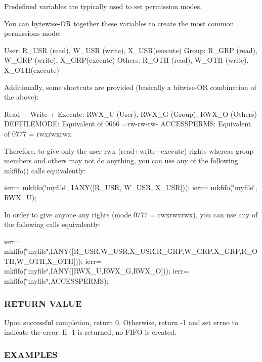 Predefined variables are typically used to set permission modes.

You can bytewise-\/\+OR together these variables to create the most common permissions mode\+:

User\+: R\+\_\+\+U\+SR (read), W\+\_\+\+U\+SR (write), X\+\_\+\+U\+S\+R(execute) Group\+: R\+\_\+\+G\+RP (read), W\+\_\+\+G\+RP (write), X\+\_\+\+G\+R\+P(execute) Others\+: R\+\_\+\+O\+TH (read), W\+\_\+\+O\+TH (write), X\+\_\+\+O\+T\+H(execute)

Additionally, some shortcuts are provided (basically a bitwise-\/\+OR combination of the above)\+:

Read + Write + Execute\+: R\+W\+X\+\_\+U (User), R\+W\+X\+\_\+G (Group), R\+W\+X\+\_\+O (Others) D\+E\+F\+F\+I\+L\+E\+M\+O\+DE\+: Equivalent of 0666 =rw-\/rw-\/rw-\/ A\+C\+C\+E\+S\+S\+P\+E\+R\+MS\+: Equivalent of 0777 = rwxrwxrwx

Therefore, to give only the user rwx (read+write+execute) rights whereas group members and others may not do anything, you can use any of the following mkfifo() calls equivalently\+:

ierr= mkfifo(\char`\"{}myfile\char`\"{}, I\+A\+N\+Y(\mbox{[}\+R\+\_\+\+U\+S\+R, W\+\_\+\+U\+S\+R, X\+\_\+\+U\+S\+R\mbox{]})); ierr= mkfifo(\char`\"{}myfile\char`\"{}, R\+W\+X\+\_\+U);

In order to give anyone any rights (mode 0777 = rwxrwxrwx), you can use any of the following calls equivalently\+:

ierr= mkfifo(\char`\"{}myfile\char`\"{},I\+A\+N\+Y(\mbox{[}\+R\+\_\+\+U\+S\+R,\+W\+\_\+\+U\+S\+R,\+X\+\_\+\+U\+S\+R,\+R\+\_\+\+G\+R\+P,\+W\+\_\+\+G\+R\+P,\+X\+\_\+\+G\+R\+P,\+R\+\_\+\+O\+T\+H,\+W\+\_\+\+O\+T\+H,\+X\+\_\+\+O\+T\+H\mbox{]})); ierr= mkfifo(\char`\"{}myfile\char`\"{},I\+A\+N\+Y(\mbox{[}\+R\+W\+X\+\_\+\+U,\+R\+W\+X\+\_\+\+G,\+R\+W\+X\+\_\+\+O\mbox{]})); ierr= mkfifo(\char`\"{}myfile\char`\"{},A\+C\+C\+E\+S\+S\+P\+E\+R\+MS); \subsubsection*{R\+E\+T\+U\+RN V\+A\+L\+UE}

Upon successful completion, return 0. Otherwise, return -\/1 and set errno to indicate the error. If -\/1 is returned, no F\+I\+FO is created.

\subsubsection*{E\+X\+A\+M\+P\+L\+ES}

